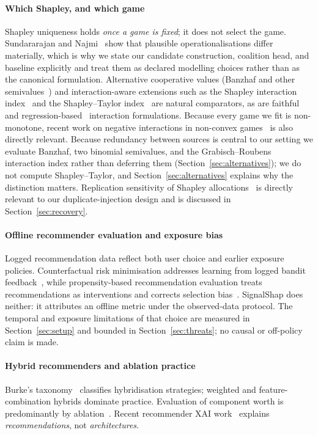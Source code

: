 \documentclass[pdflatex,sn-basic,Numbered]{sn-jnl}
\theoremstyle{plain}
\theoremstyle{definition}
\begin{document}
\paragraph{Which Shapley, and which game}
Shapley uniqueness holds \emph{once a game is fixed}; it does not select the
game. Sundararajan and Najmi~\citep{sundararajan2020many} show that plausible
operationalisations differ materially, which is why we state our candidate
construction, coalition head, and baseline explicitly and treat them as
declared modelling choices rather than as the canonical formulation.
Alternative cooperative values (Banzhaf and other semivalues~\citep{karczmarz2022banzhaf}) and interaction-aware extensions
such as the Shapley interaction index~\citep{grabisch1999interaction} and the
Shapley--Taylor index~\citep{sundararajan2020shapleytaylor} are natural
comparators, as are faithful~\citep{tsai2023faithshap} and
regression-based~\citep{fumagalli2024kernelshapiq} interaction formulations.
Because every game we fit is non-monotone, recent work on negative interactions
in non-convex games~\citep{chang2025negative} is also directly relevant. Because redundancy between sources is central to our setting we
evaluate Banzhaf, two binomial semivalues, and the Grabisch--Roubens interaction
index rather than deferring them (Section~\ref{sec:alternatives}); we do not
compute Shapley--Taylor, and Section~\ref{sec:alternatives} explains why the
distinction matters.
Replication sensitivity of Shapley allocations~\citep{han2022replication} is
directly relevant to our duplicate-injection design and is discussed in
Section~\ref{sec:recovery}.

\paragraph{Offline recommender evaluation and exposure bias}
Logged recommendation data reflect both user choice and earlier exposure
policies. Counterfactual risk minimisation addresses learning from logged bandit
feedback~\citep{swaminathan2015counterfactual}, while propensity-based
recommendation evaluation treats recommendations as interventions and corrects
selection bias~\citep{schnabel2016treatments}. SignalShap does neither: it
attributes an offline metric under the observed-data protocol. The temporal and
exposure limitations of that choice are measured in Section~\ref{sec:setup} and
bounded in Section~\ref{sec:threats}; no causal or off-policy claim is made.

\paragraph{Hybrid recommenders and ablation practice}
Burke's taxonomy~\citep{burke2002hybrid} classifies hybridisation strategies;
weighted and feature-combination hybrids dominate practice. Evaluation of
component worth is predominantly by
ablation~\citep{zangerle2022evaluating}. Recent recommender XAI
work~\citep{zhang2020explainable} explains \emph{recommendations}, not
\emph{architectures}.
\end{document}
